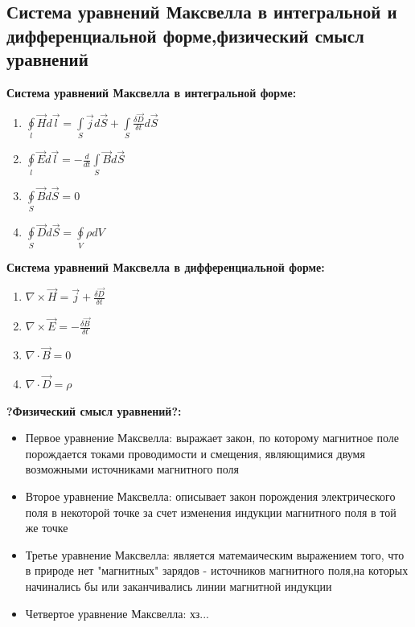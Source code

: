 \documentclass[12pt]{report}
\begin{document}
\subsection{Система уравнений Максвелла в интегральной и дифференциальной форме,физический смысл уравнений}
\textbf{Система уравнений Максвелла в интегральной форме:}\par
\begin{enumerate}
    \item $\oint\limits_l {\vec {H} d \vec {l}} = \int\limits_S {\vec {j} d \vec {S}} + \int\limits_S {\frac{\delta \vec {D}}{\delta t} d\vec {S}}$
    \item $\oint\limits_l {\vec {E} d \vec {l}} = - \frac{d}{dt} \int\limits_S {\vec {B} d \vec {S}}$
    \item $\oint\limits_S {\vec {B} d \vec {S}} = 0$
    \item $\oint\limits_S {\vec {D} d \vec {S}} = \oint\limits_V {\rho dV}$
\end{enumerate}
\textbf{Система уравнений Максвелла в дифференциальной форме:}
\begin{enumerate}
    \item $\nabla \times \vec {H} = \vec {j} + \frac{\delta \vec {D}}{\delta t}$
    \item $\nabla \times \vec {E} = - \frac{\delta \vec {B}}{\delta t}$
    \item $\nabla \cdot \vec {B} = 0$
    \item $\nabla \cdot \vec {D} = \rho$
\end{enumerate}
\textbf{?Физический смысл уравнений?:}\par
\begin{itemize}
    \item Первое уравнение Максвелла: выражает закон, по которому магнитное поле порождается токами проводимости и смещения, являющимися двумя возможными источниками магнитного поля\par
    \item Второе уравнение Максвелла: описывает закон порождения электрического поля в некоторой точке за счет изменения индукции магнитного поля в той же точке\par
    \item Третье уравнение Максвелла: является матемаическим выражением того, что в природе нет "магнитных" зарядов - источников магнитного поля,на которых начинались бы или заканчивались линии магнитной индукции\par
    \item Четвертое уравнение Максвелла: хз...\par
\end{itemize}
\end{document}
